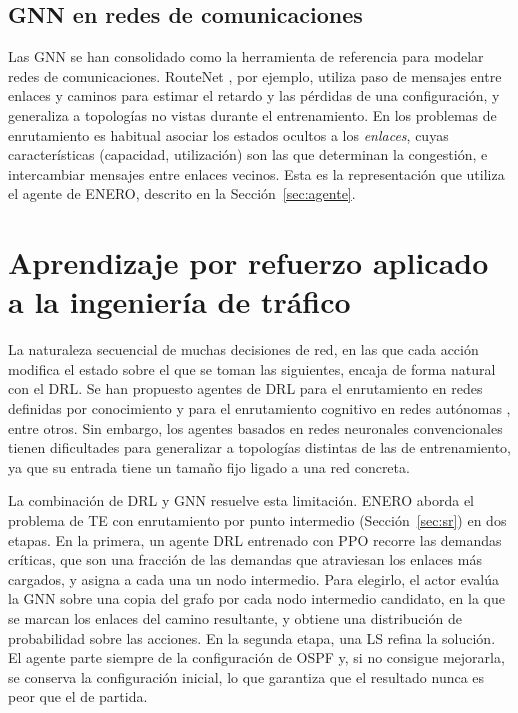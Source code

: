 \subsection{GNN en redes de comunicaciones}

Las GNN se han consolidado como la herramienta de referencia para modelar redes de comunicaciones. RouteNet \cite{rusek2020routenet}, por ejemplo, utiliza paso de mensajes entre enlaces y caminos para estimar el retardo y las pérdidas de una configuración, y generaliza a topologías no vistas durante el entrenamiento. En los problemas de enrutamiento es habitual asociar los estados ocultos a los \textit{enlaces}, cuyas características (capacidad, utilización) son las que determinan la congestión, e intercambiar mensajes entre enlaces vecinos. Esta es la representación que utiliza el agente de ENERO, descrito en la Sección~\ref{sec:agente}.

\section{Aprendizaje por refuerzo aplicado a la ingeniería de tráfico}\label{sec:drl_te}

La naturaleza secuencial de muchas decisiones de red, en las que cada acción modifica el estado sobre el que se toman las siguientes, encaja de forma natural con el DRL. Se han propuesto agentes de DRL para el enrutamiento en redes definidas por conocimiento \cite{he2023routing} y para el enrutamiento cognitivo en redes autónomas \cite{xiao2023cognitive}, entre otros. Sin embargo, los agentes basados en redes neuronales convencionales tienen dificultades para generalizar a topologías distintas de las de entrenamiento, ya que su entrada tiene un tamaño fijo ligado a una red concreta.

La combinación de DRL y GNN resuelve esta limitación. ENERO \cite{ALMASAN2022109166} aborda el problema de TE con enrutamiento por punto intermedio (Sección~\ref{sec:sr}) en dos etapas. En la primera, un agente DRL entrenado con PPO recorre las demandas críticas, que son una fracción de las demandas que atraviesan los enlaces más cargados, y asigna a cada una un nodo intermedio. Para elegirlo, el actor evalúa la GNN sobre una copia del grafo por cada nodo intermedio candidato, en la que se marcan los enlaces del camino resultante, y obtiene una distribución de probabilidad sobre las acciones. En la segunda etapa, una LS refina la solución. El agente parte siempre de la configuración de OSPF y, si no consigue mejorarla, se conserva la configuración inicial, lo que garantiza que el resultado nunca es peor que el de partida.

